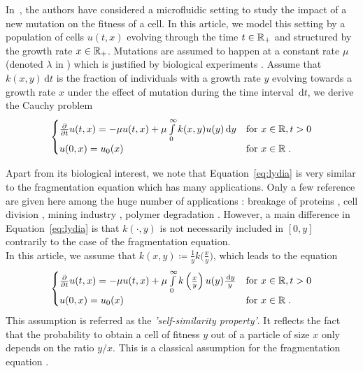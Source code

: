 \documentclass[11pt]{amsart}
\newcommand{\f}{\frac}
\newcommand{\diff}{\,\mathrm{d}}
\begin{document}
In~\cite{robert2018mutation}, the authors have considered a microfluidic setting to study the impact of a new mutation on the fitness of a cell. 
In this article, we model this setting by a population of cells $u(t,x)$ evolving through the time $t \in \mathbb{R}_+$ and structured by the growth rate $x \in \mathbb{R}_+$. Mutations are assumed to happen at a constant rate $\mu$ (denoted $\lambda$ in \cite{robert2018mutation}) which is justified by biological experiments \cite{robert2018mutation}.  Assume that $k(x,y)\diff t$ is the fraction of individuals with a growth rate $y$ evolving towards a growth rate $x$ under the effect of mutation during the time interval $\diff t$, we derive the Cauchy problem
    \begin{equation}
    \begin{cases}
    \f{\partial}{\partial t} u(t,x) = - \mu u(t,x) + \mu \int\limits_0^\infty k(x,y) u(y) \diff y 
    & \text{for } x \in \RR,  t > 0
    \\
    u(0,x) = u_0(x)  & \text{for } x \in \RR \eqfinp
    \end{cases}
    \label{eq:lydia}
    \end{equation}

Apart from its biological interest, we note that Equation~\eqref{eq:lydia} is very similar to the fragmentation equation which has many applications. Only a few reference are given here among the huge number of applications : breakage of proteins \cite{xue2013imaging}, cell division \cite{doumic2013estimating}, mining industry \cite{kolmogorov1941logarithmic, bertoin2005fragmentation}, polymer degradation \cite{montroll1940theory,ziff1985kinetics}. However, a main difference in Equation~\eqref{eq:lydia} is that $k(\cdot, y)$ is not necessarily included in $[0, y]$ contrarily to the case of the fragmentation equation. \\

In this article, we assume that $k(x,y) \coloneqq \f{1}{y}k \big(\frac{x}{y}\big)$, which leads to the equation
\begin{equation}
    \begin{cases}
    \f{\partial}{\partial t} u(t,x) = - \mu u(t,x) + \mu \int\limits_0^\infty k\left(\frac{x}{y}\right) u(y) \f{\diff y}{y} 
    & \text{for } x \in \RR,  t > 0
    \\
    u(0,x) = u_0(x)  & \text{for } x \in \RR \eqfinp
    \label{eq:lydia_selfsimilar}
    \end{cases}
\end{equation}
This assumption is referred as the \textit{'self-similarity property'}. It reflects the fact that the probability to obtain a cell of fitness $y$ out of a particle of size $x$ only depends on the ratio $y/x$. This is a classical assumption for the fragmentation equation \cite{escobedo2005self}. \\
    
\end{document}
